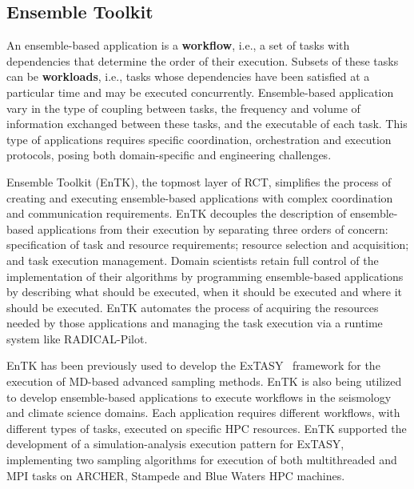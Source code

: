 \subsection{Ensemble Toolkit}

An ensemble-based application is a \textbf{workflow}, i.e., a set of tasks
with dependencies that determine the order of their execution. Subsets of
these tasks can be \textbf{workloads}, i.e., tasks whose dependencies have
been satisfied at a particular time and may be executed concurrently.
Ensemble-based application vary in the type of coupling between tasks, the
frequency and volume of information exchanged between these tasks, and the
executable of each task. This type of applications requires specific
coordination, orchestration and execution protocols, posing both
domain-specific and engineering challenges.

Ensemble Toolkit (EnTK), the topmost layer of RCT, simplifies the process of
creating and executing ensemble-based applications with complex coordination
and communication requirements. EnTK decouples the description of
ensemble-based applications from their execution by separating three orders
of concern: specification of task and resource requirements; resource
selection and acquisition; and task execution management. Domain scientists
retain full control of the implementation of their algorithms by programming
ensemble-based applications by describing what should be executed, when it
should be executed and where it should be executed. EnTK automates the
process of acquiring the resources needed by those applications and managing
the task execution via a runtime system like RADICAL-Pilot.


EnTK has been previously used to develop the
ExTASY~\cite{balasubramanian2016extasy} framework for the execution of
MD-based advanced sampling methods. EnTK is also being utilized to develop
ensemble-based applications to execute workflows in the seismology and
climate science domains. Each application requires different workflows, with
different types of tasks, executed on specific HPC resources. EnTK supported
the development of a simulation-analysis execution pattern for ExTASY,
implementing two sampling algorithms for execution of both multithreaded and
MPI tasks on ARCHER, Stampede and Blue Waters HPC machines.


